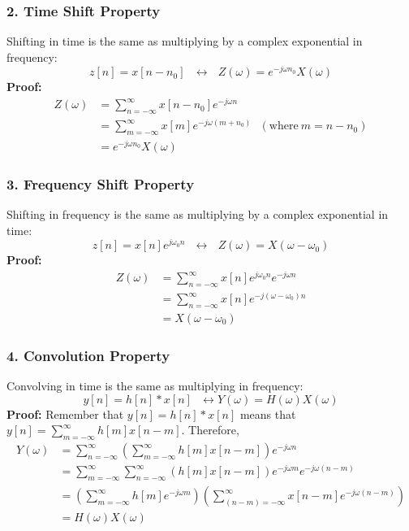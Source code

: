 \documentclass{beamer}
\begin{document}
\begin{frame}
  \frametitle{2. Time Shift Property}

  Shifting in time is the same as multiplying by a  complex exponential in frequency:
  \[
  z[n] = x[n-n_0]~~~\leftrightarrow~~~
  Z(\omega)=e^{-j\omega n_0}X(\omega)
  \]
  {\bf Proof:}
  \begin{align*}
    Z(\omega) &= \sum_{n=-\infty}^{\infty} x[n-n_0]e^{-j\omega n}\\
    &= \sum_{m=-\infty}^{\infty} x[m]e^{-j\omega (m+n_0)}~~~\left(\mbox{where}~m=n-n_0\right)\\
    &= e^{-j\omega n_0} X(\omega)
  \end{align*}
\end{frame}

\begin{frame}
  \frametitle{3. Frequency Shift Property}

  Shifting in frequency is the same as multiplying by a complex exponential in time:
  \[
  z[n] = x[n]e^{j\omega_0 n}~~~\leftrightarrow~~~
  Z(\omega)=X(\omega-\omega_0)
  \]
  {\bf Proof:}
  \begin{align*}
    Z(\omega) &= \sum_{n=-\infty}^{\infty} x[n]e^{j\omega_0 n}e^{-j\omega n}\\
    &= \sum_{n=-\infty}^{\infty} x[n]e^{-j(\omega-\omega_0) n}\\
    &= X(\omega-\omega_0)
  \end{align*}
\end{frame}

\begin{frame}
  \frametitle{4. Convolution Property}

  Convolving in time is the same as multiplying in frequency:
  \[
  y[n]=h[n]\ast x[n]~~~\leftrightarrow
  Y(\omega)=H(\omega)X(\omega)
  \]
  {\bf Proof:}
  Remember that $y[n]=h[n]\ast x[n]$ means that $y[n]=\sum_{m=-\infty}^\infty h[m]x[n-m]$.  Therefore,
  \begin{align*}
    Y(\omega) &= \sum_{n=-\infty}^{\infty}\left(\sum_{m=-\infty}^\infty h[m]x[n-m]\right)e^{-j\omega n}\\
    &= \sum_{m=-\infty}^{\infty}\sum_{n=-\infty}^\infty\left(h[m]x[n-m]\right)e^{-j\omega m}e^{-j\omega (n-m)}\\
    &= \left(\sum_{m=-\infty}^{\infty}h[m]e^{-j\omega m}\right)
    \left(\sum_{(n-m)=-\infty}^\infty  x[n-m]e^{-j\omega (n-m)}\right)\\
    &= H(\omega)X(\omega)
  \end{align*}
\end{frame}
\end{document}
